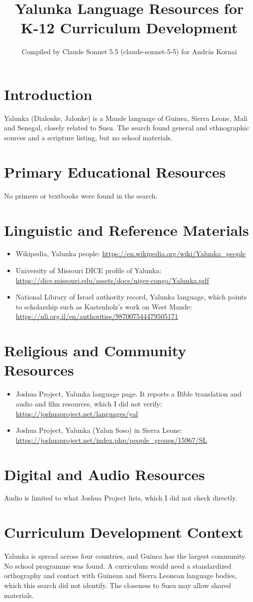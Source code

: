 \documentclass[12pt]{article}
\title{Yalunka Language Resources for K-12 Curriculum Development}
\author{Compiled by Claude Sonnet 5.5 (claude-sonnet-5-5) for Andr\'as Kornai}
\date{}
\begin{document}
\maketitle

\section{Introduction}
Yalunka (Dialonke, Jalonke) is a Mande language of Guinea, Sierra Leone, Mali and Senegal, closely related to Susu. The search found general and ethnographic sources and a scripture listing, but no school materials.

\section{Primary Educational Resources}
No primers or textbooks were found in the search.

\section{Linguistic and Reference Materials}
\begin{itemize}
\item Wikipedia, Yalunka people: \url{https://en.wikipedia.org/wiki/Yalunka_people}
\item University of Missouri DICE profile of Yalunka: \url{https://dice.missouri.edu/assets/docs/niger-congo/Yalunka.pdf}
\item National Library of Israel authority record, Yalunka language, which points to scholarship such as Kastenholz's work on West Mande: \url{https://nli.org.il/en/authorities/987007544479505171}
\end{itemize}

\section{Religious and Community Resources}
\begin{itemize}
\item Joshua Project, Yalunka language page. It reports a Bible translation and audio and film resources, which I did not verify: \url{https://joshuaproject.net/languages/yal}
\item Joshua Project, Yalunka (Yalun Soso) in Sierra Leone: \url{https://joshuaproject.net/index.php/people_groups/15967/SL}
\end{itemize}

\section{Digital and Audio Resources}
Audio is limited to what Joshua Project lists, which I did not check directly.

\section{Curriculum Development Context}
Yalunka is spread across four countries, and Guinea has the largest community. No school programme was found. A curriculum would need a standardized orthography and contact with Guinean and Sierra Leonean language bodies, which this search did not identify. The closeness to Susu may allow shared materials.
\end{document}
